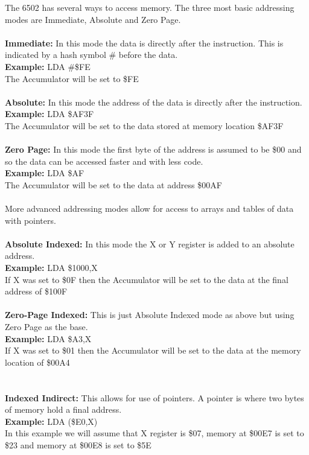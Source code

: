 \documentclass{ol-softwaremanual}
\begin{document}
The 6502 has several ways to access memory. The three most basic addressing modes are Immediate, Absolute and Zero Page.\\
\\
\textbf{Immediate:} In this mode the data is directly after the instruction. This is indicated by a hash symbol \# before the data.\\
\textbf{Example:} LDA \#\$FE\\
The Accumulator will be set to \$FE\\
\\
\textbf{Absolute:} In this mode the address of the data is directly after the instruction.\\
\textbf{Example:} LDA \$AF3F\\
The Accumulator will be set to the data stored at memory location \$AF3F\\
\\
\textbf{Zero Page:} In this mode the first byte of the address is assumed to be \$00 and so the data can be accessed faster and with less code.\\
\textbf{Example:} LDA \$AF\\
The Accumulator will be set to the data at address \$00AF\\
\\
More advanced addressing modes allow for access to arrays and tables of data with pointers.\\
\\
\textbf{Absolute Indexed:} In this mode the X or Y register is added to an absolute address.\\
\textbf{Example:} LDA \$1000,X\\
If X was set to \$0F then the Accumulator will be set to the data at the final address of \$100F\\
\\
\textbf{Zero-Page Indexed:} This is just Absolute Indexed mode as above but using Zero Page as the base.\\
\textbf{Example:} LDA \$A3,X\\
If X was set to \$01 then the Accumulator will be set to the data at the memory location of \$00A4\\
\\
\pagebreak
\\
\textbf{Indexed Indirect:} This allows for use of pointers. A pointer is where two bytes of memory hold a final address.\\
\textbf{Example:} LDA (\$E0,X)\\
In this example we will assume that X register is \$07, memory at \$00E7 is set to \$23 and memory at \$00E8 is set to \$5E\\
\end{document}
